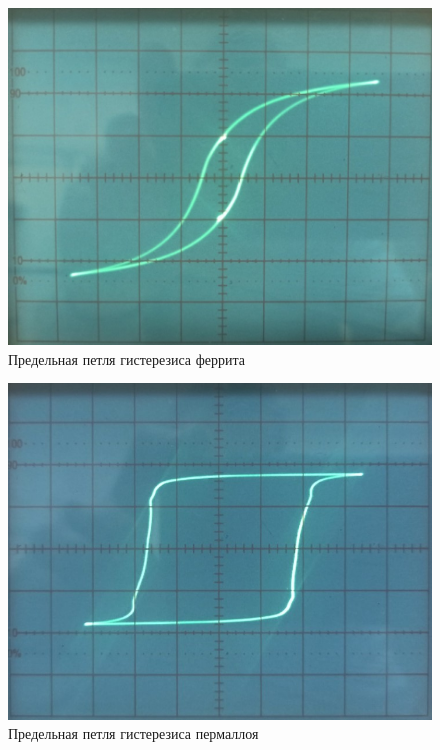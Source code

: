 \documentclass[12pt,a4paper]{article}
\begin{document}
\begin{figure}[h!]
	\centering
	\includegraphics[scale=0.3]{ferrit.jpg}
	\caption{Предельная петля гистерезиса феррита}
\end{figure}
\begin{figure}[h!]
	\centering
	\includegraphics[scale=0.3]{permalloi.jpg}
	\caption{Предельная петля гистерезиса пермаллоя}
\end{figure}
\newpage
\end{document}
